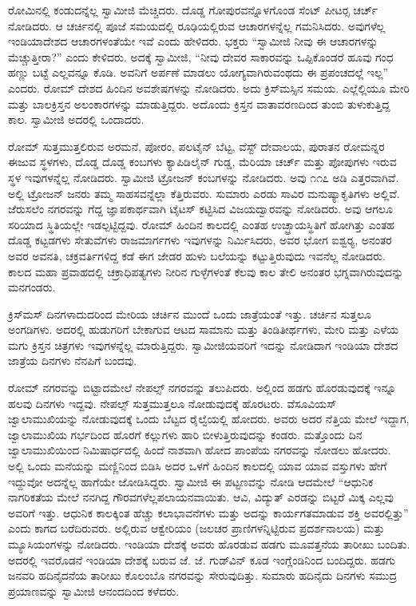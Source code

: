  ರೋಮಿನಲ್ಲಿ ಕಂಡುದನ್ನೆಲ್ಲ ಸ್ವಾಮೀಜಿ ಮೆಚ್ಚಿದರು. ದೊಡ್ಡ ಗೋಪುರವನ್ನೊಳಗೊಂಡ ಸೆಂಟ್ ಪೀಟರ‍್ಸ ಚರ್ಚ್ ನೋಡಿದರು. ಆ ಚರ್ಚಿನಲ್ಲಿ ಪೂಜೆ ಸಮಯದಲ್ಲಿ ರೂಢಿಯಲ್ಲಿರುವ ಆಚಾರಗಳನ್ನೆಲ್ಲ ಗಮನಿಸಿದರು. ಅವುಗಳೆಲ್ಲ ಇಂಡಿಯಾದೇಶದ ಆಚಾರಗಳಂತೆಯೇ ಇವೆ ಎಂದು ಹೇಳಿದರು. ಭಕ್ತರು “ಸ್ವಾಮೀಜಿ ನೀವು ಈ ಆಚಾರಗಳನ್ನು ಮೆಚ್ಚುತ್ತೀರಾ?” ಎಂದು ಕೇಳಿದರು. ಅದಕ್ಕೆ ಸ್ವಾಮೀಜಿ, “ನೀವು ದೇವರ ಸಾಕಾರವನ್ನು ಒಪ್ಪಿಕೊಂಡರೆ ಹೂವು ಗಂಧ ಹಣ್ಣು ಬಟ್ಟೆ ಎಲ್ಲವನ್ನೂ ಕೊಡಿ. ಅವನಿಗೆ ಅರ್ಪಣೆ ಮಾಡಲು ಯೋಗ್ಯವಾಗಿರುವಂಥದು ಈ ಪ್ರಪಂಚದಲ್ಲೆ ಇಲ್ಲ” ಎಂದರು. ರೋಮ್ ದೇಶದ ಹಿಂದಿನ ಅವಶೇಷಗಳನ್ನು ನೋಡಿದರು. ಅದು ಕ್ರಿಸ್‍ಮಸ್ಸಿನ ಸಮಯ. ಎಲ್ಲೆಲ್ಲಿಯೂ ಮೇರಿ ಮತ್ತು ಬಾಲಕ್ರಿಸ್ತನ ಅಲಂಕಾರಗಳನ್ನು ಮಾಡುತ್ತಿದ್ದರು. ಅದೊಂದು ಕ್ರಿಸ್ತನ ವಾತಾವರಣದಿಂದ ತುಂಬಿ ತುಳುಕುತ್ತಿದ್ದ ಕಾಲ. ಸ್ವಾಮೀಜಿ ಅದರಲ್ಲಿ ಒಂದಾದರು. 

 ರೋಮ್ ಸುತ್ತಮುತ್ತಲಿರುವ ಅರಮನೆ, ಪೋರಂ, ಪಲಟೈನ್ ಬೆಟ್ಟ, ವೆಸ್ಟ್ ದೇವಾಲಯ, ಪುರಾತನ ರೋಮನ್ನರ ಈಜುವ ಸ್ಥಳಗಳು, ದೊಡ್ಡ ದೊಡ್ಡ ಕಂಬಗಳು ಕ್ಯಾಪಿಡಿಲೈನ್ ಗುಡ್ಡ, ಮೆರಿಯಾ ಚರ್ಚ್ ಮತ್ತು ಪೋಪುಗಳು ಇರುವ ಸ್ಥಳ ಇವುಗಳನ್ನೆಲ್ಲ ನೋಡಿದರು. ಸ್ವಾಮೀಜಿ ಟ್ರೋಜನ್ ಕಂಬಗಳನ್ನು ನೋಡಿದರು. ಅವು ೧೧೭ ಅಡಿ ಎತ್ತರವಾಗಿವೆ. ಅಲ್ಲಿ ಟ್ರೋಜನ್ ಜನರು ತಮ್ಮ ಸಾಹಸವನ್ನೆಲ್ಲಾ ಕೆತ್ತಿರುವರು. ಸುಮಾರು ಎರಡು ಸಾವಿರ ಮನುಷ್ಯಾಕೃತಿಗಳು ಅಲ್ಲಿವೆ. ಜೆರುಸಲೆಂ ನಗರವನ್ನು ಗೆದ್ದ ಜ್ಞಾಪಕಾರ್ಥವಾಗಿ ಟೈಟಸ್ ಕಟ್ಟಿಸಿದ ವಿಜಯದ್ವಾರವನ್ನು ನೋಡಿದರು. ಅವು ಆಗಲೂ ಸರಿಯಾದ ಸ್ಥಿತಿಯಲ್ಲೇ ಇಡಲ್ಪಟ್ಟಿದ್ದವು. ರೋಮ್ ಹಿಂದಿನ ಕಾಲದಲ್ಲಿ ಎಂತಹ ಉಚ್ಛ್ರಾಯಸ್ಥಿತಿಗೆ ಹೋಗಿತ್ತು ಎಂತಹ ದೊಡ್ಡ ಕಟ್ಟಡಗಳು ಸೇತುವೆಗಳು ರಾಜಮಾರ್ಗಗಳು ಇವುಗಳನ್ನು ನಿರ್ಮಿಸಿದರು, ಅವರ ಭೋಗ ಐಶ್ವರ‍್ಯ, ಅನಂತರ ಅವರ ಅವನತಿ, ಚಕ್ರವರ್ತಿಗಳಿದ್ದ ಕಡೆ ಈಗ ಜೇಡರ ಹುಳು ಬಲೆಯನ್ನು ಕಟ್ಟುತ್ತಿರುವುದು ಇವನೆಲ್ಲ ನೋಡಿದರು. ಕಾಲದ ಮಹಾ ಪ್ರವಾಹದಲ್ಲಿ ಚಕ್ರಾಧಿಪತ್ಯಗಳು ನೀರಿನ ಗುಳ್ಳೆಗಳಂತೆ ಕೆಲವು ಕಾಲ ತೇಲಿ ಅನಂತರ ಭಗ್ನವಾಗಿರುವುದನ್ನು ಮನಗಂಡರು. 

 ಕ್ರಿಸ್‍ಮಸ್ ದಿನಗಳಾದುದರಿಂದ ಮೇರಿಯ ಚರ್ಚಿನ ಮುಂದೆ ಒಂದು ಜಾತ್ರೆಯಂತೆ ಇತ್ತು. ಚರ್ಚಿನ ಸುತ್ತಲೂ ಅಂಗಡಿಗಳು. ಅದರಲ್ಲಿ ಹುಡುಗರಿಗೆ ಬೇಕಾಗುವ ಆಟದ ಸಾಮಾನು ಮತ್ತು ತಿಂಡಿತೀರ್ಥಗಳು, ಮೇರಿ ಮತ್ತು ಎಳೆಯ ಮಗು ಕ್ರಿಸ್ತನ ಚಿತ್ರಗಳು ಇವುಗಳನ್ನೆಲ್ಲ ಮಾರುತ್ತಿದ್ದರು. ಸ್ವಾಮೀಜಿಯವರಿಗೆ ಇದನ್ನು ನೋಡಿದಾಗ ಇಂಡಿಯಾ ದೇಶದ ಜಾತ್ರೆಯ ದಿನಗಳು ನೆನಪಿಗೆ ಬಂದವು. 

 ರೋಮ್ ನಗರವನ್ನು ಬಿಟ್ಟಾದಮೇಲೆ ನೇಪಲ್ಸ್ ನಗರವನ್ನು ತಲುಪಿದರು. ಅಲ್ಲಿಂದ ಹಡಗು ಹೊರಡುವುದಕ್ಕೆ ಇನ್ನೂ ಹಲವು ದಿನಗಳು ಇದ್ದವು. ನೇಪಲ್ಸ್ ಸುತ್ತಮುತ್ತಲೂ ನೋಡುವುದಕ್ಕೆ ಹೊರಟರು. ವೆಸೂವಿಯಸ್ ಜ್ವಾಲಾಮುಖಿಯನ್ನು ನೋಡುವುದಕ್ಕೆ ಒಂದು ಬೆಟ್ಟದ ರೈಲ್ವೆಯಲ್ಲಿ ಹೋದರು. ಅವರು ಅದರ ನೆತ್ತಿಯ ಮೇಲೆ ಇದ್ದಾಗ, ಜ್ವಾಲಾಮುಖಿಯ ಗರ್ಭದಿಂದ ಹೊರಗೆ ಕಲ್ಲುಗಳು ಹಾರಿ ಬೀಳುತ್ತಿರುವುದನ್ನು ಕಂಡರು. ಮತ್ತೊಂದು ದಿನ ಜ್ವಾಲಾಮುಖಿಯಿಂದ ನಿಮಿಷಾರ್ಧದಲ್ಲಿ ಹಿಂದೆ ನಾಶವಾಗಿ ಹೋದ ಪಾಂಪೆಯ ನಗರವನ್ನು ನೋಡಲು ಹೋದರು. ಅಲ್ಲಿ ಒಂದು ಮನೆಯನ್ನು ಮಣ್ಣಿನಿಂದ ಬಿಡಿಸಿ ಅದರ ಒಳಗೆ ಹಿಂದಿನ ಕಾಲದಲ್ಲಿ ಯಾವ ಯಾವ ವಸ್ತುಗಳು ಹೇಗೆ ಇದ್ದುವೋ ಅದನ್ನೆಲ್ಲ ಹಾಗೆಯೇ ಜೋಡಿಸಿದ್ದರು. ಸ್ವಾಮೀಜಿ ಈ ಪಟ್ಟಣವನ್ನು ನೋಡಿ ಆದಮೇಲೆ “ಆಧುನಿಕ ನಾಗರಿಕತೆಯ ಮೇಲೆ ನನಗಿದ್ದ ಗೌರವಗಳೆಲ್ಲ\break ಪಲಾಯನವಾಯಿತು. ಆವಿ, ವಿದ್ಯುತ್ ಎರಡನ್ನು ಬಿಟ್ಟರೆ ಮಿಕ್ಕ ಎಲ್ಲವು ಅವರಿಗೆ ಇತ್ತು. ಆಧುನಿಕ ಕಾಲಕ್ಕಿಂತ ಹೆಚ್ಚು ಕಲಾಭಾವನೆಗಳು ಮತ್ತು ಅದನ್ನು ಕಾರ್ಯಗತಮಾಡುವ ಶಕ್ತಿ ಅವರಲ್ಲಿತ್ತು” ಎಂದು ಕಾಗದ ಬರೆದಿರುವರು. ಅಲ್ಲಿರುವ ಆಕ್ವೇರಿಯಂ (ಜಲಚರ ಪ್ರಾಣಿಗಳನ್ನಿಟ್ಟಿರುವ ಪ್ರದರ್ಶನಾಲಯ) ಮತ್ತು ಮ್ಯೂಸಿಯಂಗಳನ್ನು ನೋಡಿದರು. ಇಂಡಿಯಾ ದೇಶಕ್ಕೆ ಅವರು ಹೊರಡುವ ಹಡಗು ಮೂವತ್ತನೆಯ ತಾರೀಖು ಬಂದಿತು. ಅದರಲ್ಲಿ ಇವರೊಡನೆ ಇಂಡಿಯಾ ದೇಶಕ್ಕೆ ಬರುವ ಜೆ. ಜೆ. ಗುಡ್‍ವಿನ್ ಕೂಡ ಇಂಗ್ಲೆಂಡಿನಿಂದ ಬಂದಿದ್ದರು. ಹಡಗು ಜನವರಿ ಹದಿನೈದನೆಯ ತಾರೀಖು ಕೊಲಂಬೊ ನಗರವನ್ನು ಸೇರುವುದಿತ್ತು. ಸುಮಾರು ಹದಿನೈದು ದಿನಗಳು ಸಮುದ್ರ ಪ್ರಯಾಣವನ್ನು ಸ್ವಾಮೀಜಿ ಆನಂದದಿಂದ ಕಳೆದರು. 

